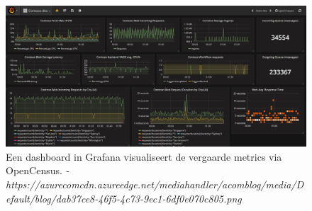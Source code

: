 \begin{figure}
	\includegraphics[width=\linewidth]{img/metrics.png}
	\caption{Een dashboard in Grafana visualiseert de vergaarde metrics via OpenCensus. \textit{- https://azurecomcdn.azureedge.net/mediahandler/acomblog/media/Default/blog/dab37ce8-46f5-4c73-9ec1-6df0e070c805.png}}
	\label{fig:metrics}
\end{figure}